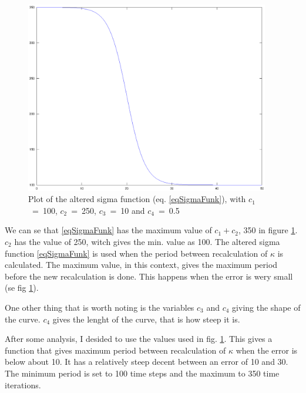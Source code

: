 		\begin{figure}[b!htp]
			\label{figSigmaFunk}
			\begin{center}
				\includegraphics[width=0.95\textwidth]{sigmaPlot.eps}
			\end{center}
			\caption{Plot of the altered sigma function (eq. \ref{eqSigmaFunk}), with \mbox{$c_1$ = 100}, \mbox{$c_2$ = 250}, \mbox{$c_3$ = 10} and \mbox{$c_4$ = 0.5} }
		\end{figure}
	
		We can se that \eqref{eqSigmaFunk} has the maximum value of $c_1+c_2$, 350 in figure \ref{figSigmaFunk}. $c_2$ has the value of 250, witch gives the min. value as 100.
		The altered sigma function \eqref{eqSigmaFunk} is used when the period between recalculation of $\kappa$ is calculated. 
		The maximum value, in this context, gives the maximum period before the new recalculation is done. This happens when the error is wery small (se fig \ref{figSigmaFunk}).

		One other thing that is worth noting is the variables $c_3$ and $c_4$ giving the shape of the curve. $c_4$ gives the lenght of the curve, that is how steep it is.
		
		After some analysis, I desided to use the values used in fig. \ref{figSigmaFunk}.
		This gives a function that gives maximum period between recalculation of $\kappa$ when the error is below about 10. 
		It has a relatively steep decent between an error of 10 and 30. The minimum period is set to 100 time steps and the maximum to 350 time iterations.

